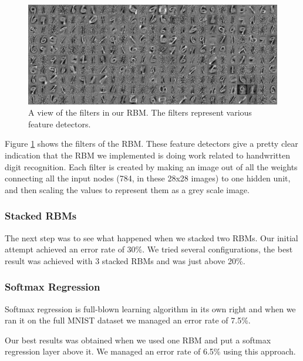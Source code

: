 \documentclass[11pt]{article}
\begin{document}
\begin{figure}[htb!]
  \centering
  \includegraphics[width=\textwidth]{filters.png}
  \caption{A view of the filters in our RBM.  The filters represent various feature detectors.}
  \label{fig:filters}
\end{figure}

Figure \ref{fig:filters} shows the filters of the RBM.  These feature detectors give a pretty clear indication that the RBM we implemented is doing work related to handwritten digit recognition.  Each filter is created by making an image out of all the weights connecting all the input nodes (784, in these 28x28 images) to one hidden unit, and then scaling the values to represent them as a grey scale image.

\subsubsection{Stacked RBMs}

The next step was to see what happened when we stacked two RBMs.  Our initial attempt achieved an error rate of 30\%.  We tried several configurations, the best result was achieved with 3 stacked RBMs and was just above 20\%.

\subsubsection{Softmax Regression}

Softmax regression is full-blown learning algorithm in its own right and when we ran it on the full MNIST dataset we managed an error rate of 7.5\%.

Our best results was obtained when we used one RBM and put a softmax regression layer above it.  We managed an error rate of 6.5\% using this approach.
\end{document}
